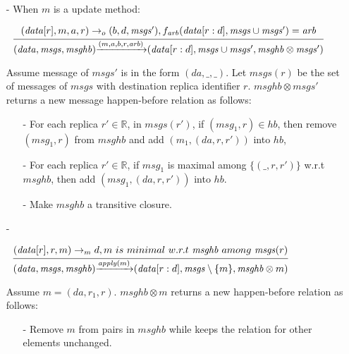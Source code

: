 \begin {itemize}
\begin{itemize}
    \item[-] When $m$ is a update method:

    $\begin{array}{l c} \bigfrac{ (\mathit{data}[r],m,a,r) \rightarrow_o (b,d,\mathit{msgs}'), f_{\mathit{arb}}(\mathit{data}[r:d], \mathit{msgs} \cup \mathit{msgs}') = \mathit{arb} } {(\mathit{data},\mathit{msgs},\mathit{msghb}) {\xrightarrow{(m,a,b,r,\mathit{arb})}} (\mathit{data}[r:d],\mathit{msgs} \cup \mathit{msgs}',\mathit{msghb} \otimes \mathit{msgs}')} \end{array}$

    Assume message of $\mathit{msgs}'$ is in the form $(\mathit{da},\_,\_)$. Let $\mathit{msgs}(r)$ be the set of messages of $\mathit{msgs}$ with destination replica identifier $r$. $\mathit{msghb} \otimes \mathit{msgs}'$ returns a new message happen-before relation as follows:

        \begin{itemize}
        \setlength{\itemsep}{0.5pt}
        \item[-] For each replica $r' \in \mathbb{R}$, in $\mathit{msgs}(r')$, if $(\mathit{msg}_1,r) \in \mathit{hb}$, then remove $(\mathit{msg}_1,r)$ from $\mathit{msghb}$ and add $(m_1,(\mathit{da},r,r'))$ into $\mathit{hb}$,

        \item[-] For each replica $r' \in \mathbb{R}$, if $\mathit{msg}_1$ is maximal among $\{ (\_,r,r') \}$ w.r.t $\mathit{msghb}$, then add $(\mathit{msg}_1,(\mathit{da},r,r'))$ into $\mathit{hb}$.

        \item[-] Make $\mathit{msghb}$ a transitive closure.
        \end{itemize}

    \item[-]

        $\begin{array}{l c} \bigfrac{ (\mathit{data}[r],r,m) \rightarrow_m d, m \ is \ minimal \ w.r.t \ \mathit{msghb} \ among \ \mathit{msgs}(r) } {(\mathit{data},\mathit{msgs},\mathit{msghb}) {\xrightarrow{\mathit{apply}(m)}} (\mathit{data}[r:d],\mathit{msgs} \setminus \{ m \}, \mathit{msghb} \otimes m )} \end{array}$

         Assume $m = (\mathit{da},r_1,r)$. $\mathit{msghb} \otimes m$ returns a new happen-before relation as follows:

        \begin{itemize}
        \setlength{\itemsep}{0.5pt}
        \item[-] Remove $m$ from pairs in $\mathit{msghb}$ while keeps the relation for other elements unchanged.


\end{itemize}
\end{itemize}
\end{itemize}
